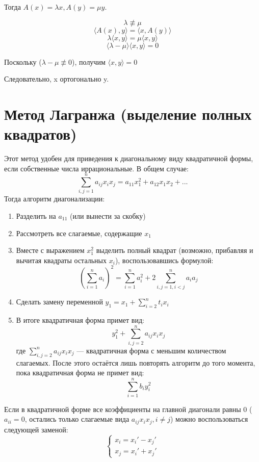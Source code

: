 \documentclass[12pt]{article}
\begin{document}
    Тогда $A(x) = \lambda x, A(y) = \mu y$.

    \[
        \lambda \not \equiv \mu
    \]
    \[
        \langle A(x), y \rangle = \langle x, A(y) \rangle
    \]
    \[
        \lambda \langle x, y\rangle = \mu \langle x, y\rangle
    \]
    \[
        \langle \lambda - \mu\rangle\langle x, y\rangle = 0
    \]

    Поскольку ($\lambda - \mu \not\equiv 0$), получим $\langle x, y\rangle = 0$

    Следовательно, x ортогонально y.

    \setcounter{section}{17}
    \section{Метод Лагранжа (выделение полных квадратов)}
    Этот метод удобен для приведения к диагональному виду квадратичной формы, если собственные числа иррациональные. В общем случае:
    \[
        \sum_{i,j=1}^n a_{ij}x_ix_j = a_{11}x_1^2 + a_{12}x_1x_2 + ...
    \]
    Тогда алгоритм диагонализации:
    \begin{enumerate}
        \item Разделить на $a_{11}$ (или вынести за скобку)
        \item Рассмотреть все слагаемые, содержащие $x_1$
        \item Вместе с выражением $x_1^2$ выделить полный квадрат (возможно, прибавляя и вычитая квадраты остальных $x_i$), воспользовавшись формулой:
              \[
                  (\sum_{i = 1}^n a_i)^2 = \sum_{i = 1}^na_i^2 + 2\sum_{i,j=1, i<j}^na_ia_j
              \]
        \item Сделать замену переменной $\displaystyle y_1 = x_1 + \sum_{i=2}^nt_ix_i$
        \item В итоге квадратичная форма примет вид:
              \[
                  y_1^2 + \sum_{i,j=2}^na_{ij}x_ix_j
              \]
              где $\displaystyle \sum_{i,j=2}^na_{ij}x_ix_j$ — квадратичная форма с меньшим количеством слагаемых. После этого остаётся лишь повторять алгоритм до того момента, пока квадратичная форма не примет вид:
              \[
                  \sum_{i=1}^nb_iy_i^2
              \]
    \end{enumerate}

    Если в квадратичной форме все коэффициенты на главной диагонали равны $0$ ($a_{ii} = 0$, остались только слагаемые вида $a_{ij}x_ix_j, i \neq j$) можно воспользоваться следующей заменой:
    \[
        \begin{cases}
            x_i = x_i' - x_j' \\
            x_j = x_i' + x_j'
        \end{cases}
    \]
\end{document}
